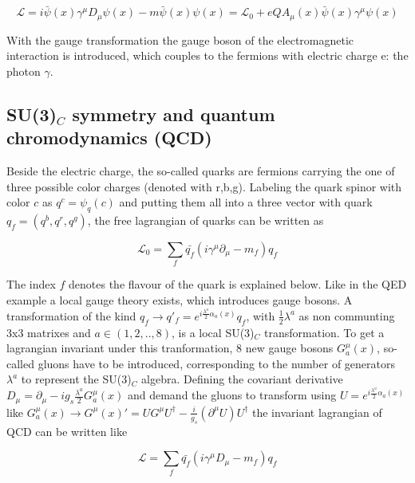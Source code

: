 \begin{equation}
	\mathcal{L} = i\bar{\psi}(x)\gamma^{\mu}D_{\mu}\psi(x) - m\bar{\psi}(x)\psi(x) = \mathcal{L}_{0} + eQA_{\mu}(x)\bar{\psi}(x)\gamma^{\mu}\psi(x)
\end{equation}

With the gauge transformation the gauge boson of the electromagnetic interaction is introduced, which couples to the fermions with electric charge e: the photon $\gamma$.


\subsection*{\small SU(3)${_C}$ symmetry and quantum chromodynamics (QCD)}

Beside the electric charge, the so-called quarks are fermions carrying the one of three possible color charges (denoted with r,b,g). Labeling the quark spinor with color $c$ as $q^{c} = \psi_{q}(c)$ and putting them all into a three vector with quark $q_{f} = (q^{b}, q^{r}, q^{g})$, the free lagrangian of quarks can be written as

\begin{equation}
	\mathcal{L}_{0} = \sum_{f} \bar{q_{f}}(i\gamma^{\mu}\partial_{\mu} - m_{f})q_{f}
\end{equation}

The index $f$ denotes the flavour of the quark is explained below. Like in the QED example a local gauge theory exists, which introduces gauge bosons. A transformation of the kind $q_{f} \rightarrow q'_{f} = e^{i\frac{\lambda^{a}}{2}\alpha_{a}(x)} q_{f}$, with $\frac{1}{2} \lambda^{a}$ as non communting 3x3 matrixes and $a \in (1, 2, .., 8)$, is a local SU(3)$_{C}$ transformation. To get a lagrangian invariant under this tranformation, 8 new gauge bosons $G^{\mu}_{a}(x)$, so-called gluons have to be introduced, corresponding to the number of generators $\lambda^{a}$ to represent the SU(3)$_{C}$ algebra. Defining the covariant derivative $D_{\mu} = \partial_{\mu}-ig_{s}\frac{\lambda^{a}}{2}G^{\mu}_{a}(x)$ and demand the gluons to transform using $U = e^{i\frac{\lambda^{a}}{2}\alpha_{a}(x)}$ like $G^{\mu}_{a}(x) \rightarrow G^{\mu}(x)' = UG^{\mu}U^{\dagger} - \frac{i}{g_s}(\partial^{\mu}U)U^{\dagger}$ the invariant lagrangian of QCD can be written like 

\begin{equation}
	\mathcal{L} = \sum_{f} \bar{q_{f}}(i\gamma^{\mu}D_{\mu} - m_{f})q_{f}
\end{equation}


